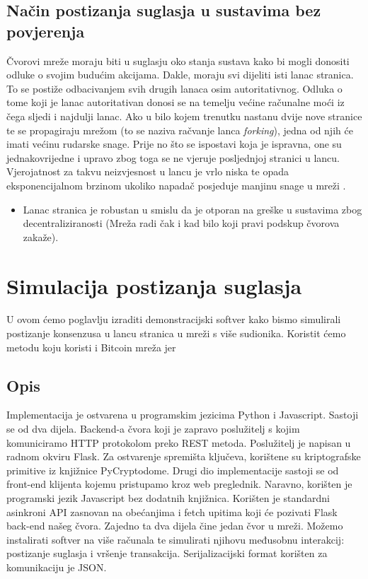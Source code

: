 \documentclass[utf8, zavrsni]{fer}
\begin{document}
\section{Način postizanja suglasja u sustavima bez povjerenja}
Čvorovi mreže moraju biti u suglasju oko stanja sustava kako bi mogli donositi odluke o svojim budućim akcijama. Dakle, moraju svi dijeliti isti lanac stranica. To se postiže odbacivanjem svih drugih lanaca osim autoritativnog. Odluka o tome koji je lanac autoritativan donosi se na temelju većine računalne moći iz čega sljedi i najdulji lanac. Ako u bilo kojem trenutku nastanu dvije nove stranice te se propagiraju mrežom (to se naziva račvanje lanca \textit{forking}), jedna od njih će imati većinu rudarske snage. Prije no što se ispostavi koja je ispravna, one su jednakovrijedne i upravo zbog toga se ne vjeruje posljednjoj stranici u lancu. Vjerojatnost za takvu neizvjesnost u lancu je vrlo niska te opada eksponencijalnom brzinom ukoliko napadač posjeduje manjinu snage u mreži \cite{btc, satoshi}.
\begin{itemize}
	\item Lanac stranica je robustan u smislu da je otporan na greške u sustavima zbog decentraliziranosti (Mreža radi čak i kad bilo koji pravi podskup čvorova zakaže).
\end{itemize}

\chapter{Simulacija postizanja suglasja}

U ovom ćemo poglavlju izraditi demonstracijski softver kako bismo simulirali postizanje konsenzusa u lancu stranica u mreži s više sudionika. Koristit ćemo metodu koju koristi i Bitcoin mreža jer 

\section{Opis}
Implementacija je ostvarena u programskim jezicima Python i Javascript. Sastoji se od dva dijela. Backend-a čvora koji je zapravo poslužitelj s kojim komuniciramo HTTP protokolom preko REST metoda. Poslužitelj je napisan u radnom okviru Flask. Za ostvarenje spremišta ključeva, korištene su kriptografske primitive iz knjižnice PyCryptodome. Drugi dio implementacije sastoji se od front-end klijenta kojemu pristupamo kroz web preglednik. Naravno, korišten je programski jezik Javascript bez dodatnih knjižnica. Korišten je standardni asinkroni API zasnovan na obećanjima i fetch upitima koji će pozivati Flask back-end našeg čvora. Zajedno ta dva dijela čine jedan čvor u mreži. Možemo instalirati softver na više računala te simulirati njihovu međusobnu interakcij: postizanje suglasja i vršenje transakcija. Serijalizacijski format korišten za komunikaciju je JSON.
\end{document}
